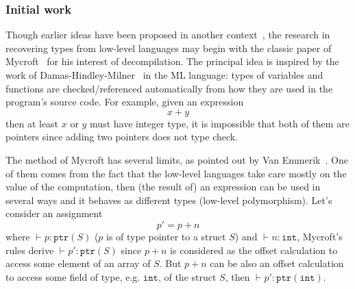 \documentclass[compsoc,conference,a4paper,10pt,times]{IEEEtran}
\begin{document}

\subsubsection*{Initial work}
\noindent
Though earlier ideas have been proposed in another context~\cite{shivers_data-flow_1990},
the research in recovering types from low-level languages may begin with the classic paper of
Mycroft~\cite{mycroft_type-based_1999} for his interest of decompilation. The principal idea is
inspired by the work of Damas-Hindley-Milner~\cite{milner_theory_1978,hindley_principal_1969,damas_principal_1982} in
the ML language: types of variables and functions are checked/referenced automatically
from how they are used in the program's source code. For example, given an expression
\begin{equation*}
  x + y
\end{equation*}
then at least $x$ or $y$ must have integer type, it is impossible that both of them are pointers
since adding two pointers does not type check.

The method of Mycroft has several limits, as pointed out by Van Emmerik~\cite{van_emmerik_static_2007}.
One of them comes from the fact that the low-level languages take care mostly on the value of
the computation, then (the result of) an expression can be used in several ways and it behaves as
different types (low-level polymorphism). Let's consider an assignment
\begin{equation*}
  p' = p + n
\end{equation*}
where $\vdash p \colon \mathtt{ptr}(S)$ ($p$ is of type pointer to a struct $S$) and
$\vdash n \colon \mathtt{int}$, Mycroft's
rules derive $\vdash p' \colon \mathtt{ptr}(S)$ since $p + n$ is considered as the offset calculation to
access some element of an array of $S$. But $p + n$ can be also an
offset calculation to access some field of type, e.g. $\mathtt{int}$, of the struct $S$,
then $\vdash p' \colon \mathtt{ptr}(\mathtt{int})$.
\end{document}
